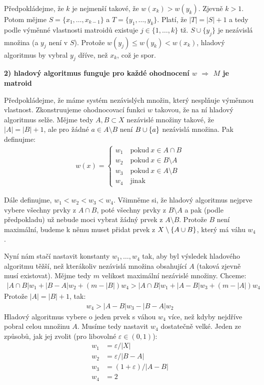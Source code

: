 Předpokládejme, že $k$ je nejmenší takové, že $w(x_k) > w(y_k)$. Zjevně $k > 1$.
Potom mějme $S = \{x_1,\dots,x_{k-1}\}$ a $T = \{y_1,\dots,y_k\}$. Platí, že
$|T| = |S|+1$ a tedy podle výměnné vlastnosti matroidů existuje $j \in
\{1,\dots,k\}$ tž. $S\cup \{y_j\}$ je nezávislá množina (a $y_j$ není v $S$).
Protože $w(y_j) \le w(y_k) < w(x_k)$, hladový algoritmus by vybral $y_j$ dříve,
než $x_k$, což je spor.

\noindent \textbf{2) hladový algoritmus funguje pro každé ohodnocení $w$
$\Rightarrow$ $M$ je matroid}

Předpokládejme, že máme systém nezávislých množin, který nesplňuje výměnnou
vlastnost. Zkonstruujeme ohodnocovací funkci $w$ takovou, že na ní hladový
algoritmus selže. Mějme tedy $A,B \subset X$ nezávislé množiny takové, že $|A| =
|B| + 1$, ale pro žádné $a \in A\setminus B$ není $B\cup \{a\}$ nezávislá
množina. Pak definujme:
\begin{align*}
w(x) = \left\{
	\begin{array}{lr}
		w_1\quad\text{pokud}~x \in A\cap B \\
		w_2\quad\text{pokud}~x \in B \setminus A \\
		w_3\quad\text{pokud}~x \in A \setminus B \\
		w_4\quad\text{jinak}
	\end{array}
	\right.
\end{align*}

Dále definujme, $w_1 < w_2 < w_3 < w_4$. Všimněme si, že hladový algoritmus
nejprve vybere všechny prvky z $A\cap B$, poté všechny prvky z $B\setminus A$ a
pak (podle předpokladu) už nebude moci vybrat žádný prvek z $A\setminus B$.
Protože $B$ není maximální, budeme k němu muset přidat prvek z
$X\setminus\{A\cup B\}$, který má váhu $w_4$.

Nyní nám stačí nastavit konstanty $w_1,\dots,w_4$ tak, aby byl výsledek
hladového algoritmu těžší, než kterákoliv nezávislá množina obsahující $A$
(taková zjevně musí existovat). Mějme tedy $m$ velikost maximální nezávislé
množiny. Chceme:
\begin{align*}
|A\cap B|w_1 + |B-A|w_2 + (m-|B|)w_4 > |A\cap B|w_1 + |A-B|w_3 + (m-|A|)w_4
\end{align*}
Protože $|A| = |B|+1$, tak:
\begin{align}
\label{rov:hungry-w4}
w_4 > |A-B|w_3 - |B-A|w_2
\end{align}
Hladový algoritmus vybere o jeden prvek s váhou $w_4$ více, než kdyby nejdříve
pobral celou množinu $A$. Musíme tedy nastavit $w_4$ dostatečně velké. Jeden ze
způsobů, jak jej zvolit (pro libovolné $\varepsilon\in (0,1)$):
\begin{align*}
w_1 &= \varepsilon /|X| \\
w_2 &= \varepsilon /|B-A| \\
w_3 &= (1+\varepsilon) /|A-B| \\
w_4 &= 2
\end{align*}

